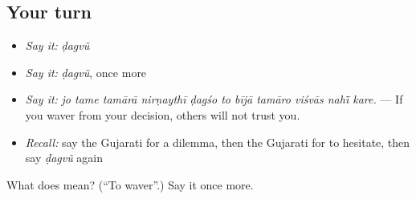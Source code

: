 \subsection*{Your turn}
\begin{itemize}
\raggedright
  \item \emph{Say it:} \emph{ḍagvũ}
  \item \emph{Say it:} \emph{ḍagvũ}, once more
  \item \emph{Say it:} \emph{jo tame tamārā nirṇaythī ḍagśo to bījā tamāro viśvās nahī̃ kare.} — If you waver from your decision, others will not trust you.
  \item \emph{Recall:} say the Gujarati for a dilemma, then the Gujarati for to hesitate, then say \emph{ḍagvũ} again
\end{itemize}

\begin{tcolorbox}[breakable,colback=teal!4,colframe=teal!35!black,title={Before you move on}]
What does  mean? (\textquotedblleft{}To waver\textquotedblright{}.) Say it once more.
\end{tcolorbox}
